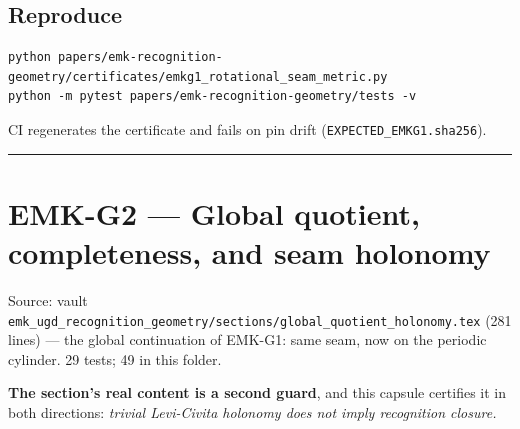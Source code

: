 \hypertarget{reproduce}{%
\section{Reproduce}\label{reproduce}}

\begin{verbatim}
python papers/emk-recognition-geometry/certificates/emkg1_rotational_seam_metric.py
python -m pytest papers/emk-recognition-geometry/tests -v
\end{verbatim}

CI regenerates the certificate and fails on pin drift
(\texttt{EXPECTED\_EMKG1.sha256}).

\begin{center}\rule{0.5\linewidth}{0.5pt}\end{center}

\hypertarget{emk-g2-global-quotient-completeness-and-seam-holonomy}{%
\chapter{EMK-G2 --- Global quotient, completeness, and seam holonomy}\label{emk-g2-global-quotient-completeness-and-seam-holonomy}}

Source: vault \texttt{emk\_ugd\_recognition\_geometry/sections/global\_quotient\_holonomy.tex}
(281 lines) --- the global continuation of EMK-G1: same seam, now on the
periodic cylinder. 29 tests; 49 in this folder.

\textbf{The section's real content is a second guard}, and this capsule
certifies it in both directions: \emph{trivial Levi-Civita holonomy does not
imply recognition closure.}

